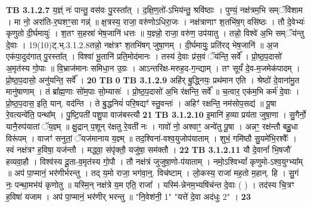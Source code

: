 \documentclass[17pt]{extarticle}
\begin{document}
                  \newline
                                \textbf{ TB 3.1.2.7} \newline
                  य॒ज्ञ्ं नः॑ पान्तु॒ वस॑वः पु॒रस्ता᳚त् । द॒क्षि॒ण॒तो॑-ऽभिय॑न्तु॒ श्रवि॑ष्ठाः । पुण्यं॒ नक्ष॑त्रम॒भि सम्ॅवि॑शाम । मा नो॒ अरा॑ति-र॒घशꣳ॒॒सा गन्न्॑ ॥ क्ष॒त्रस्य॒ राजा॒ वरु॑णोऽधिरा॒जः । नक्ष॑त्राणाꣳ श॒तभि॑ष॒ग् वसि॑ष्ठः । तौ दे॒वेभ्यः॑ कृणुतो दी॒र्घमायुः॑ । श॒तꣳ स॒हस्रा॑ भेष॒जानि॑ धत्तः ॥ य॒ज्ञ्न्नो॒ राजा॒ वरु॑ण॒ उप॑यातु । तन्नो॒ विश्वे॑ अ॒भि सम्ॅय॑न्तु दे॒वाः । 19(10)ट्.भ्.3.1.2.8तन्नो॒ नक्ष॑त्रꣳ श॒तभि॑षग् जुषा॒णम् । दी॒र्घमायुः॒ प्रति॑रद् भेष॒जानि॑ ॥ अ॒ज एक॑पा॒दुद॑गात् पु॒रस्ता᳚त् । विश्वा॑ भू॒तानि॑ प्रति॒मोद॑मानः । तस्य॑ दे॒वाः प्र॑स॒वं ॅय॑न्ति॒ सर्वे᳚ । प्रो॒ष्ठ॒प॒दासो॑ अ॒मृत॑स्य गो॒पाः ॥  वि॒भ्राज॑मानः समिधा॒न उ॒ग्रः । आऽन्तरि॑क्ष-मरुह॒द-ग॒न्द्याम् । तꣳ सूर्यं॑ दे॒व-म॒जमेक॑पादम् । प्रो॒ष्ठ॒प॒दासो॒ अनु॑यन्ति॒ सर्वे᳚ । \textbf{ 20} \newline
                  \newline
                                \textbf{ TB } \newline
                   \textbf{ 0} \newline
                  \newline
                                \textbf{ TB 3.1.2.9} \newline
                  अहि॑र् बु॒द्ध्नियः॒ प्रथ॑मान एति । श्रेष्ठो॑ दे॒वाना॑मु॒त मानु॑षाणाम् । तं ब्रा᳚ह्म॒णाः सो॑म॒पाः सो॒म्यासः॑ । प्रो॒ष्ठ॒प॒दासो॑ अ॒भि र॑क्षन्ति॒ सर्वे᳚ ॥ च॒त्वार॒ एक॑म॒भि कर्म॑ दे॒वाः । प्रो॒ष्ठ॒प॒दास॒ इति॒ यान्. वद॑न्ति । ते बु॒द्धनियं॑ परि॒षद्यꣳ॑ स्तु॒वन्तः॑ । अहिꣳ॑ रक्षन्ति॒ नम॑सोप॒सद्य॑ ॥ पू॒षा रे॒वत्यन्वे॑ति॒ पन्था᳚म् । पु॒ष्टि॒पती॑ पशु॒पा वाज॑बस्त्यौ \textbf{ 21} \newline
                  \newline
                                \textbf{ TB 3.1.2.10} \newline
                  इ॒मानि॑ ह॒व्या प्रय॑ता जुषा॒णा । सु॒गैर्नो॒ यानै॒रुप॑यातां ॅय॒ज्ञ्म् ॥ क्षु॒द्रान् प॒शून् र॑क्षतु रे॒वती॑ नः । गावो॑ नो॒ अश्वाꣳ॒॒ अन्वे॑तु पू॒षा । अन्नꣳ॒॒ रक्ष॑न्तौ बहु॒॒धा विरू॑पम् । वाजꣳ॑ सनुतां॒ ॅयज॑मानाय य॒ज्ञ्म् ॥ तद॒श्विना॑-वश्व॒युजोप॑याताम् । शुभं॒ गमि॑ष्ठौ सु॒यमे॑भि॒रश्वैः᳚ । स्वं नक्ष॑त्रꣳ ह॒विषा॒ यज॑न्तौ । मद्ध्वा॒ संपृ॑क्तौ॒ यजु॑षा॒ सम॑क्तौ । \textbf{ 22} \newline
                  \newline
                                \textbf{ TB 3.1.2.11} \newline
                  यौ दे॒वानां᳚ भि॒षजौ॑ हव्यवा॒हौ । विश्व॑स्य दू॒ता-व॒मृत॑स्य गो॒पौ । तौ नक्ष॑त्रं जुजुषा॒णो-प॑याताम् । नमो॒ऽश्विभ्यां᳚ कृणुमो-ऽश्व॒युग्भ्या᳚म् ॥ अप॑ पा॒प्मानं॒ भर॑णीर्भरन्तु । तद् य॒मो राजा॒ भग॑वा॒न्॒. विच॑ष्टाम् । लो॒कस्य॒ राजा॑ मह॒तो म॒हान्. हि । सु॒गं नः॒ पन्था॒मभ॑यं कृणोतु ॥ यस्मि॒न् नक्ष॑त्रे य॒म एति॒ राजा᳚ । यस्मि॑-न्नेनम॒भ्यषि॑चंन्त दे॒वाः ( ) । तद॑स्य चि॒त्रꣳ ह॒विषा॑ यजाम । अप॑ पा॒प्मानं॒ भर॑णीर् भरन्तु ॥ "नि॒वेश॑नी॒ {1}" "यत्ते॑ दे॒वा अद॑धुः {2}" । \textbf{ 23} \newline
\end{document}
